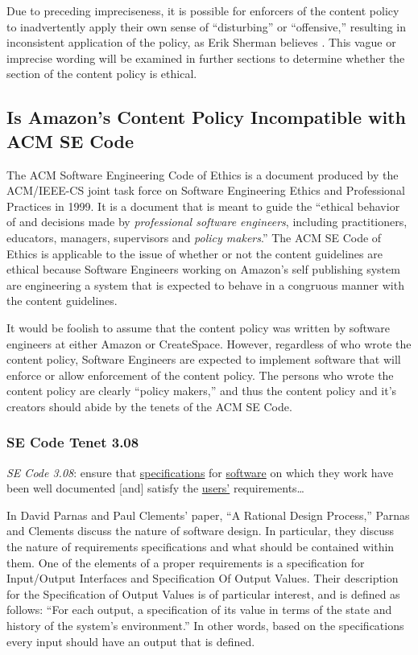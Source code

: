 \documentclass[11pt]{article}
\begin{document}
\begin{multicols}{2}
Due to preceding impreciseness, it is possible for enforcers of the content policy to inadvertently apply their own sense of ``disturbing'' or ``offensive,'' resulting in inconsistent application of the policy, as Erik Sherman believes \cite{ShermanAmazonExecs}.  This vague or imprecise wording will be examined in further sections to determine whether the section of the content policy is ethical.

\subsection{Is Amazon's Content Policy Incompatible with ACM SE Code}

The ACM Software Engineering Code of Ethics is a document produced by the ACM/IEEE-CS joint task force on Software Engineering Ethics and Professional Practices in 1999. \cite{SECode} It is a document that is meant to guide the ``ethical behavior of and decisions made by \emph{professional software engineers}, including practitioners, educators, managers, supervisors and \emph{policy makers}.'' \cite[Emphasis Mine]{SECode} The ACM SE Code of Ethics is applicable to the issue of whether or not the content guidelines are ethical because Software Engineers working on Amazon's self publishing system are engineering a system that is expected to behave in a congruous manner with the content guidelines. %

It would be foolish to assume that the content policy was written by software engineers at either Amazon or CreateSpace.  However, regardless of who wrote the content policy, Software Engineers are expected to implement software that will enforce or allow enforcement of the content policy.  The persons who wrote the content policy are clearly ``policy makers,'' and thus the content policy and it's creators should abide by the tenets of the ACM SE Code.

\subsubsection{SE Code Tenet 3.08}

\emph{SE Code 3.08}: ensure that \underline{specifications} for \underline{software} on which they work have been well documented [and] satisfy the \underline{users'} requirements\ldots 

In David Parnas and Paul Clements' paper, ``A Rational Design Process,'' Parnas and Clements discuss the nature of software design. \cite{fakeit} In particular, they discuss the nature of requirements specifications and what should be contained within them.  One of the elements of a proper requirements is a specification for Input/Output Interfaces and Specification Of Output Values.  Their description for the Specification of Output Values is of particular interest, and is defined as follows: ``For each output, a specification of its value in terms of the state and history of the system's environment.'' \cite{fakeit} In other words, based on the specifications every input should have an output that is defined. 


\end{multicols}
\end{document}

